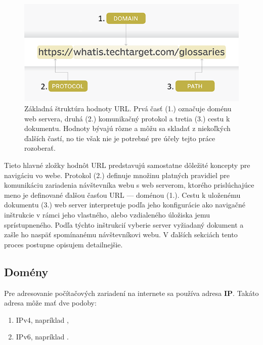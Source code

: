 \begin{figure}[htb]
\begin{center}
 \includegraphics[scale=0.52]{obrazky-figures/the-anatomy-of-a-url.png}
 \caption{\centering Základná štruktúra hodnoty URL. Prvá časť (1.) označuje doménu web servera, druhá (2.) komunikačný protokol a tretia (3.) cestu k dokumentu. Hodnoty bývajú rôzne a môžu sa skladať z niekoľkých ďalších častí, no tie však nie je potrebné pre účely tejto práce rozoberať.}
 \label{img:urlstructure}
\end{center}
\end{figure}

\pagebreak

Tieto hlavné zložky hodnôt URL predstavujú samostatne dôležité koncepty pre navigáciu vo webe.
Protokol (2.) definuje množinu platných pravidiel pre komunikáciu zariadenia návštevníka webu s web 
serverom, ktorého prislúchajúce meno je definované ďalšou časťou URL --- doménou (1.). 
Cestu k uloženému dokumentu (3.) web server interpretuje podľa jeho konfigurácie ako navigačné inštrukcie 
v rámci jeho vlastného, alebo vzdialeného úložiska jemu sprístupneného. 
Podľa týchto inštrukcií vyberie server vyžiadaný dokument a zašle ho naspäť spomínanému návštevníkovi webu.
V ďalších sekciách tento proces postupne opisujem detailnejšie.

\subsection{Domény}
\label{domeny}

Pre adresovanie počítačových zariadení na internete sa používa adresa \textbf{IP}.
Takáto adresa môže mať dve podoby:
\begin{enumerate}
    \item IPv4, napríklad ,
    \item IPv6, napríklad .
\end{enumerate}

